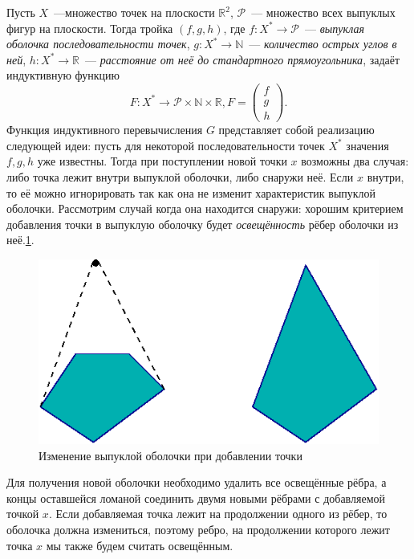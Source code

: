 Пусть $X$~---множество точек на плоскости $\mathbb{R}^2$, $\mathcal{P}$~---
множество всех выпуклых фигур на плоскости. Тогда тройка $(f,g,h)$, где
$f\colon X^* \rightarrow \mathcal{P}$~---
\emph{выпуклая оболочка последовательности точек},
$g\colon X^* \rightarrow \mathbb{N}$~--- \emph{количество острых углов в ней},
$h\colon X^* \rightarrow \mathbb{R}$~---
\emph{расстояние от неё до стандартного прямоугольника}, задаёт индуктивную
функцию $$F\colon X^* \rightarrow \mathcal{P} \times \mathbb{N} \times
\mathbb{R}, F = \begin{pmatrix}f\\ g\\ h\end{pmatrix}.$$
Функция индуктивного перевычисления $G$ представляет собой реализацию следующей
идеи: пусть для некоторой последовательности точек $X^*$ значения $f,g,h$ уже известны.
Тогда при поступлении новой точки $x$ возможны два случая:
либо точка лежит внутри выпуклой оболочки, либо снаружи неё. Если $x$ внутри,
то её можно игнорировать так как она не изменит характеристик выпуклой оболочки.
Рассмотрим случай когда она находится снаружи: хорошим критерием добавления точки в выпуклую оболочку будет \emph{освещённость} рёбер оболочки из неё.\ref{fig:conv_light}.
\begin{figure}[ht!]
\begin{center}
\includegraphics[scale=0.6]{images/conv_a_2}
\end{center}
\vspace*{-8mm}
\caption{Изменение выпуклой оболочки при добавлении точки}\label{fig:conv_light}
\end{figure}

Для получения новой оболочки необходимо удалить все освещённые рёбра, а концы
оставшейся ломаной соединить двумя новыми рёбрами с добавляемой точкой $x$.
Если добавляемая точка лежит на продолжении одного из рёбер, то оболочка должна
измениться, поэтому ребро, на продолжении которого лежит точка $x$ мы также будем
считать освещённым.


